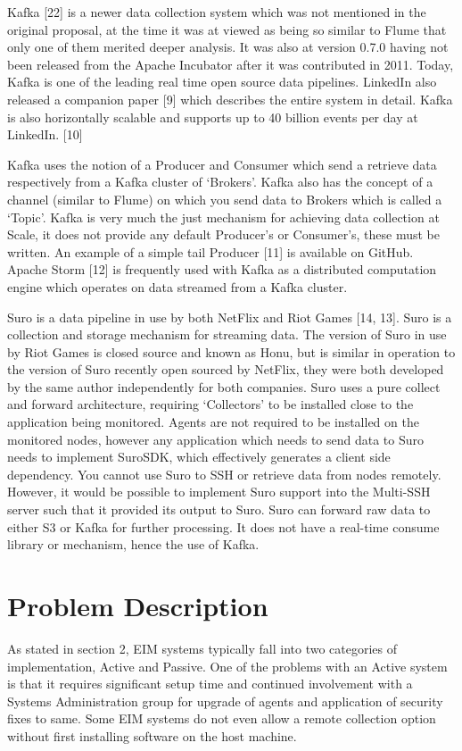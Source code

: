 \documentclass{llncs}
\begin{document}
Kafka [22] is a newer data collection system which was not mentioned in the original proposal, at the time it was at viewed as being so similar to Flume that only one of them merited deeper analysis. It was also at version 0.7.0 having not been released from the Apache Incubator after it was contributed in 2011. Today, Kafka is one of the leading real time open source data pipelines. LinkedIn also released a companion paper [9] which describes the entire system in detail. Kafka is also horizontally scalable and supports up to 40 billion events per day at LinkedIn. [10]

Kafka uses the notion of a Producer and Consumer which send a retrieve data respectively from a Kafka cluster of ‘Brokers’. Kafka also has the concept of a channel (similar to Flume) on which you send data to Brokers which is called a ‘Topic’. Kafka is very much the just mechanism for achieving data collection at Scale, it does not provide any default Producer’s or Consumer’s, these must be written. An example of a simple tail Producer [11] is available on GitHub. Apache Storm [12] is frequently used with Kafka as a distributed computation engine which operates on data streamed from a Kafka cluster.

Suro is a data pipeline in use by both NetFlix and Riot Games [14, 13]. Suro is a collection and storage mechanism for streaming data. The version of Suro in use by Riot Games is closed source and known as Honu, but is similar in operation to the version of Suro recently open sourced by NetFlix, they were both developed by the same author independently for both companies. Suro uses a pure collect and forward architecture, requiring ‘Collectors’ to be installed close to the application being monitored. Agents are not required to be installed on the monitored nodes, however any application which needs to send data to Suro needs to implement SuroSDK, which effectively generates a client side dependency. You cannot use Suro to SSH or retrieve data from nodes remotely. However, it would be possible to implement Suro support into the Multi-SSH server such that it provided its output to Suro. Suro can forward raw data to either S3 or Kafka for further processing. It does not have a real-time consume library or mechanism, hence the use of Kafka.
\newpage
\section{Problem Description}

As stated in section 2, EIM systems typically fall into two categories of implementation, Active and Passive. One of the problems with an Active system is that it requires significant setup time and continued involvement with a Systems Administration group for upgrade of agents and application of security fixes to same. Some EIM systems do not even allow a remote collection option without first installing software on the host machine.
\end{document}
